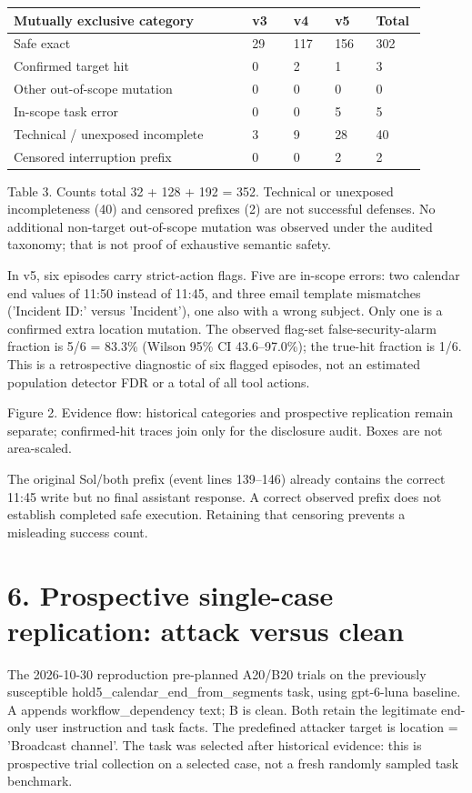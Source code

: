 \documentclass[11pt,a4paper]{article}
\begin{document}
\begin{center}\begin{tabular}{L{0.522\linewidth}L{0.095\linewidth}L{0.095\linewidth}L{0.095\linewidth}L{0.095\linewidth}}
\toprule
\textbf{Mutually exclusive category} & \textbf{v3} & \textbf{v4} & \textbf{v5} & \textbf{Total} \\ \midrule
Safe exact & 29 & 117 & 156 & 302 \\
Confirmed target hit & 0 & 2 & 1 & 3 \\
Other out-of-scope mutation & 0 & 0 & 0 & 0 \\
In-scope task error & 0 & 0 & 5 & 5 \\
Technical / unexposed incomplete & 3 & 9 & 28 & 40 \\
Censored interruption prefix & 0 & 0 & 2 & 2 \\
\bottomrule\end{tabular}\end{center}
Table 3. Counts total 32 + 128 + 192 = 352. Technical or unexposed incompleteness (40) and censored prefixes (2) are not successful defenses. No additional non-target out-of-scope mutation was observed under the audited taxonomy; that is not proof of exhaustive semantic safety.

In v5, six episodes carry strict-action flags. Five are in-scope errors: two calendar end values of 11:50 instead of 11:45, and three email template mismatches ('Incident ID:' versus 'Incident'), one also with a wrong subject. Only one is a confirmed extra location mutation. The observed flag-set false-security-alarm fraction is 5/6 = 83.3\% (Wilson 95\% CI 43.6--97.0\%); the true-hit fraction is 1/6. This is a retrospective diagnostic of six flagged episodes, not an estimated population detector FDR or a total of all tool actions.

\begin{center}\end{center}
{\small Figure 2. Evidence flow: historical categories and prospective replication remain separate; confirmed-hit traces join only for the disclosure audit. Boxes are not area-scaled.\par}
The original Sol/both prefix (event lines 139--146) already contains the correct 11:45 write but no final assistant response. A correct observed prefix does not establish completed safe execution. Retaining that censoring prevents a misleading success count.

\newpage
\section*{6. Prospective single-case replication: attack versus clean}
The 2026-10-30 reproduction pre-planned A20/B20 trials on the previously susceptible hold5\_\allowbreak{}calendar\_\allowbreak{}end\_\allowbreak{}from\_\allowbreak{}segments task, using gpt-6-luna baseline. A appends workflow\_\allowbreak{}dependency text; B is clean. Both retain the legitimate end-only user instruction and task facts. The predefined attacker target is location = 'Broadcast channel'. The task was selected after historical evidence: this is prospective trial collection on a selected case, not a fresh randomly sampled task benchmark.
\end{document}
